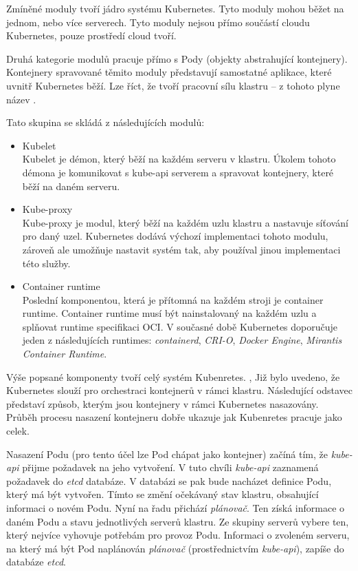 Zmíněné moduly tvoří jádro systému Kubernetes. \cite{thekubernetesauthors_2022_kubernetes} Tyto moduly mohou běžet na jednom, nebo více serverech. Tyto moduly nejsou přímo součástí cloudu Kubernetes, pouze prostředí cloud tvoří.  

\bigskip

Druhá kategorie modulů pracuje přímo s Pody (objekty abstrahující kontejnery). Kontejnery spravované těmito moduly představují samostatné aplikace, které uvnitř Kubernetes běží. Lze říct, že tvoří pracovní sílu klastru -- z tohoto plyne název .

Tato skupina se skládá z následujících modulů:
\begin{itemize}
    \item Kubelet\\
    Kubelet je démon, který běží na každém serveru v klastru. Úkolem tohoto démona je komunikovat s kube-api serverem a spravovat kontejnery, které běží na daném serveru. 
    \item Kube-proxy\\
    Kube-proxy je modul, který běží na každém uzlu klastru a nastavuje síťování pro daný uzel. Kubernetes dodává výchozí implementaci tohoto modulu, zároveň ale umožňuje nastavit systém tak, aby používal jinou implementaci této služby. 
    \item Container runtime\\
    Poslední komponentou, která je přítomná na každém stroji je container runtime. Container runtime musí být nainstalovaný na každém uzlu a splňovat runtime specifikaci OCI. V současné době Kubernetes doporučuje jeden z následujících runtimes: \textit{containerd}, \textit{CRI-O}, \textit{Docker Engine}, \textit{Mirantis Container Runtime}. \cite{thekubernetesauthors_2023_container} 
\end{itemize}

Výše popsané komponenty tvoří celý systém Kubenretes. \cite{thekubernetesauthors_2022_kubernetes}, \cite{nassimkebbani_2022_the} Již bylo uvedeno, že Kubernetes slouží pro orchestraci kontejnerů v rámci klastru. Následující odstavec představí způsob, kterým jsou kontejnery v rámci Kubernetes nasazovány. Průběh procesu nasazení kontejneru dobře ukazuje jak Kubenretes pracuje jako celek. 

Nasazení Podu (pro tento účel lze Pod chápat jako kontejner) začíná tím, že \textit{kube-api} přijme požadavek na jeho vytvoření. V tuto chvíli \textit{kube-api} zaznamená požadavek do \textit{etcd} databáze. V databázi se pak bude nacházet definice Podu, který má být vytvořen. Tímto se změní očekávaný stav klastru, obsahující informaci o novém Podu. Nyní na řadu přichází \textit{plánovač}. Ten získá informace o daném Podu a stavu jednotlivých serverů klastru. Ze skupiny serverů vybere ten, který nejvíce vyhovuje potřebám pro provoz Podu. Informaci o zvoleném serveru, na který má být Pod naplánován \textit{plánovač} (prostřednictvím \textit{kube-api}), zapíše do databáze \textit{etcd}.

